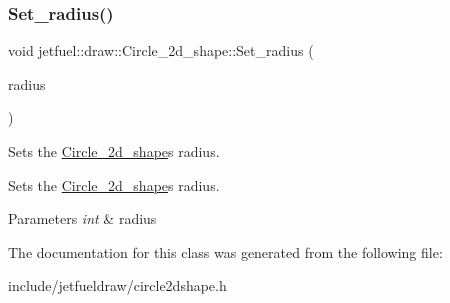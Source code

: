 \subsubsection{\texorpdfstring{Set\+\_\+radius()}{Set\_radius()}}
{\footnotesize\ttfamily void jetfuel\+::draw\+::\+Circle\+\_\+2d\+\_\+shape\+::\+Set\+\_\+radius (\begin{DoxyParamCaption}\item[{const int}]{radius }\end{DoxyParamCaption})\hspace{0.3cm}{\ttfamily [inline]}}



Sets the \hyperlink{classjetfuel_1_1draw_1_1Circle__2d__shape}{Circle\+\_\+2d\+\_\+shape}\textquotesingle{}s radius. 

Sets the \hyperlink{classjetfuel_1_1draw_1_1Circle__2d__shape}{Circle\+\_\+2d\+\_\+shape}\textquotesingle{}s radius.


\begin{DoxyParams}{Parameters}
{\em int} & radius \\
\hline
\end{DoxyParams}


The documentation for this class was generated from the following file\+:\begin{DoxyCompactItemize}
\item 
include/jetfueldraw/circle2dshape.\+h\end{DoxyCompactItemize}

